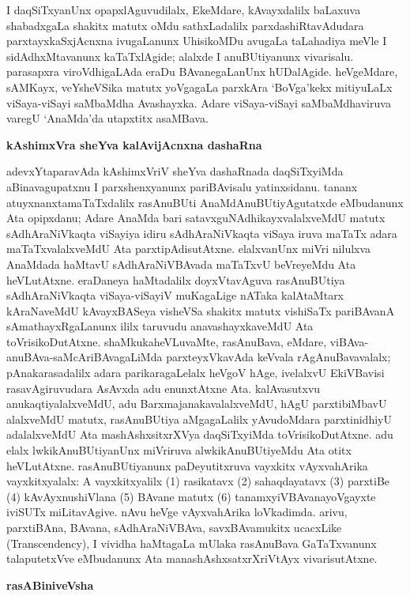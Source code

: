 I daqSiTxyanUnx opapxlAguvudilalx, EkeMdare, kAvayxdalilx baLaxuva shabadxgaLa shakitx matutx oMdu sathxLadalilx parxdashiRtavAdudara parxtayxkaSxjAcnxna ivugaLanunx UhisikoMDu avugaLa taLahadiya meVle I sidAdhxMtavanunx kaTaTxlAgide; alalxde I anuBUtiyanunx vivarisalu. parasapxra viroVdhigaLAda eraDu BAvanegaLanUnx hUDalAgide. heVgeMdare, sAMKayx, veYsheVSika matutx yoVgagaLa parxkAra `BoVga'kekx mitiyuLaLx viSaya-viSayi saMbaMdha Avashayxka. Adare viSaya-viSayi saMbaMdhaviruva varegU `AnaMda'da utapxtitx asaMBava.

\bigskip
\begin{center}
{\Large\bf kAshimxVra sheYva kalAvijAcnxna dashaRna}
\end{center}

adevxYtaparavAda kAshimxVriV sheYva dashaRnada daqSiTxyiMda aBinavagupatxnu I parxshenx\-yanunx pariBAvisalu yatinxsidanu. tananx atuyxnanxtamaTaTxdalilx rasAnuBUti AnaMdAnu\-BUtiyAgutatxde eMbudanunx Ata opipxdanu; Adare AnaMda bari satavxguNAdhikayxvalalx\-veMdU matutx sAdhAraNiVkaqta viSayiya idiru sAdhAraNiVkaqta viSaya iruva maTaTx adara maTaTxvalalxveMdU Ata parxtipAdisutAtxne. elalxvanUnx miVri nilulxva AnaMdada haMtavU sAdhAraNiVBAvada maTaTxvU beVreyeMdu Ata heVLutAtxne. eraDaneya haMta\-dalilx doyxVtavAguva rasAnuBUtiya sAdhAraNiVkaqta viSaya-viSayiV muKagaLige nATaka kalAtaMtarx kAraNaveMdU kAvayxBASeya visheVSa shakitx matutx vishiSaTx pariBAvanA sAmathayxRgaLanunx ililx taruvudu anavashayxkaveMdU Ata toVrisikoDutAtxne. shaMkuka\break heVLuvaMte, rasAnuBava, eMdare, viBAva-anuBAva-saMcAriBAvagaLiMda parxteyxVka\-vAda keVvala rAgAnuBavavalalx; pAnakarasadalilx adara parikaragaLelalx heVgoV hAge, ivelalxvU EkiVBavisi rasavAgiruvudara AsAvxda adu enunxtAtxne Ata. kalAvasutxvu anukaqtiyalalxveMdU, adu BarxmajanakavalalxveMdU, hAgU parxtibiMbavU alalxveMdU matutx, rasAnuBUtiya aMgagaLalilx yAvudoMdara parxtinidhiyU adalalxveMdU Ata mashAshxsitxrXVya daqSiTxyiMda toVrisikoDutAtxne. adu elalx lwkikAnuBUtiyanUnx miVriruva alwkikAnuBUtiyeMdu Ata otitx heVLutAtxne. rasAnuBUtiyanunx paDeyutitxruva vayxkitx vAyxvahArika vayxkitxyalalx: A vayxkitxyalilx (1) rasikatavx (2) sahaqdayatavx (3) parxtiBe (4) kAvAyxnushiVlana (5) BAvane matutx (6) tanamxyiVBAvanayoVgayxte iviSUTx miLitavAgive. nAvu heVge vAyxvahArika loVkadimda. arivu, parxtiBAna, BAvana, sAdhAraNiVBAva, savxBAvamukitx ucacxLike {\rm(Transcendency)}, I vividha haMtagaLa mUlaka rasAnuBava GaTaTxvanunx talaputetxVve eMbudanunx Ata manashAshxsatxrXriVtAyx vivarisutAtxne.

\bigskip
\begin{center}
{\Large\bf rasABiniveVsha}
\end{center}

